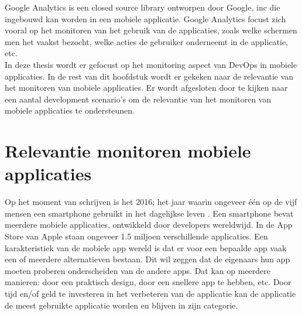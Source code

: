 Google Analytics is een closed source library ontworpen door Google, inc die ingebouwd kan worden in een mobiele applicatie. Google Analytics focust zich vooral op het monitoren van het gebruik van de applicaties, zoals welke schermen men het vaakst bezocht, welke acties de gebruiker onderneemt in de applicatie, etc.\\

In deze thesis wordt er gefocust op het monitoring aspect van DevOps in mobiele applicaties. In de rest van dit hoofdstuk wordt er gekeken naar de relevantie van het monitoren van mobiele applicaties. Er wordt afgesloten door te kijken naar een aantal development scenario's om de relevantie van het monitoren van mobiele applicaties te ondersteunen.


\section{Relevantie monitoren mobiele applicaties}
Op het moment van schrijven is het 2016; het jaar waarin ongeveer \'e\'en op de vijf mensen een smartphone gebruikt in het dagelijkse leven \cite{SmartphoneUsers}. Een smartphone bevat meerdere mobiele applicaties, ontwikkeld door developers wereldwijd. In de App Store van Apple staan ongeveer 1.5 miljoen verschillende applicaties. Een karakteristiek van de mobiele app wereld is dat er voor een bepaalde app vaak een of meerdere alternatieven bestaan. Dit wil zeggen dat de eigenaars hun app moeten proberen onderscheiden van de andere apps. Dat kan op meerdere manieren: door een praktisch design, door een snellere app te hebben, etc. Door tijd en/of geld te investeren in het verbeteren van de applicatie kan de applicatie de meest gebruikte applicatie worden en blijven in zijn categorie. \\

